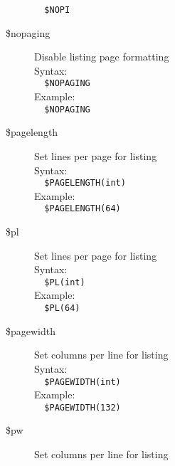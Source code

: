 \documentclass[a4paper,twoside,12pt]{book}
\begin{document}
\begin{description}
				\verb'  '{\color{highlight_control}\verb'$NOPI'}\\
			\item[\$nopaging] Disable listing page formatting\\
				Syntax:\\
				\verb'  '{\color{highlight_control}\verb'$NOPAGING'}\\
				Example:\\
				\verb'  '{\color{highlight_control}\verb'$NOPAGING'}\\
			\item[\$pagelength] Set lines per page for listing\\
				Syntax:\\
				\verb'  '{\color{highlight_control}\verb'$PAGELENGTH'}{\color{highlight_symbol}\verb'('}{\color{highlight_string}\verb'int'}{\color{highlight_symbol}\verb')'}\\
				Example:\\
				\verb'  '{\color{highlight_control}\verb'$PAGELENGTH'}{\color{highlight_symbol}\verb'('}{\color{highlight_string}\verb'64'}{\color{highlight_symbol}\verb')'}\\
			\item[\$pl] Set lines per page for listing\\
				Syntax:\\
				\verb'  '{\color{highlight_control}\verb'$PL'}{\color{highlight_symbol}\verb'('}{\color{highlight_string}\verb'int'}{\color{highlight_symbol}\verb')'}\\
				Example:\\
				\verb'  '{\color{highlight_control}\verb'$PL'}{\color{highlight_symbol}\verb'('}{\color{highlight_string}\verb'64'}{\color{highlight_symbol}\verb')'}\\
			\item[\$pagewidth] Set columns per line for listing\\
				Syntax:\\
				\verb'  '{\color{highlight_control}\verb'$PAGEWIDTH'}{\color{highlight_symbol}\verb'('}{\color{highlight_string}\verb'int'}{\color{highlight_symbol}\verb')'}\\
				Example:\\
				\verb'  '{\color{highlight_control}\verb'$PAGEWIDTH'}{\color{highlight_symbol}\verb'('}{\color{highlight_string}\verb'132'}{\color{highlight_symbol}\verb')'}\\
			\item[\$pw] Set columns per line for listing\\

\end{description}
\end{document}
